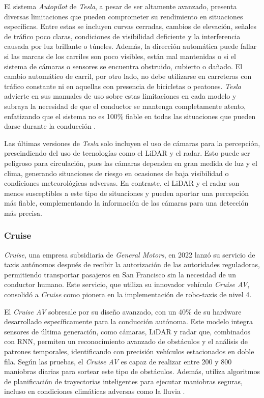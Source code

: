 El sistema \textit{Autopilot} de \textit{Tesla}, a pesar de ser altamente avanzado, presenta diversas limitaciones que pueden comprometer su rendimiento en situaciones específicas. Entre estas se incluyen curvas cerradas, cambios de elevación, señales de tráfico poco claras, condiciones de visibilidad deficiente y la interferencia causada por luz brillante o túneles. Además, la dirección automática puede fallar si las marcas de los carriles son poco visibles, están mal mantenidas o si el sistema de cámaras o sensores se encuentra obstruido, cubierto o dañado. El cambio automático de carril, por otro lado, no debe utilizarse en carreteras con tráfico constante ni en aquellas con presencia de bicicletas o peatones. \textit{Tesla} advierte en sus manuales de uso sobre estas limitaciones en cada modelo y subraya la necesidad de que el conductor se mantenga completamente atento, enfatizando que el sistema no es 100\% fiable en todas las situaciones que pueden darse durante la conducción \cite{tesla-limitations}.

Las últimas versiones de \textit{Tesla} solo incluyen el uso de cámaras para la percepción, prescindiendo del uso de tecnologías como el \ac{LiDAR} y el radar. Esto puede ser peligroso para circulación, pues las cámaras dependen en gran medida de luz y el clima, generando situaciones de riesgo en ocasiones de baja visibilidad o condiciones meteorológicas adversas. En contraste, el \ac{LiDAR} y el radar son menos susceptibles a este tipo de situaciones y pueden aportar una percepción más fiable, complementando la información de las cámaras para una detección más precisa.

\subsubsection{Cruise}

\textit{Cruise}, una empresa subsidiaria de \textit{General Motors}, en 2022 lanzó su servicio de taxis autónomos después de recibir la autorización de las autoridades reguladoras, permitiendo transportar pasajeros en San Francisco sin la necesidad de un conductor humano. Este servicio, que utiliza su innovador vehículo \textit{Cruise AV}, consolidó a \textit{Cruise} como pionera en la implementación de robo-taxis de nivel 4. 

El \textit{Cruise AV} sobresale por su diseño avanzado, con un 40\% de su hardware desarrollado específicamente para la conducción autónoma. Este modelo integra sensores de última generación, como cámaras, \ac{LiDAR} y radar que, combinados con \ac{RNN}, permiten un reconocimiento avanzado de obstáculos y el análisis de patrones temporales, identificando con precisión vehículos estacionados en doble fila. Según las pruebas, el \textit{Cruise AV} es capaz de realizar entre 200 y 800 maniobras diarias para sortear este tipo de obstáculos. Además, utiliza algoritmos de planificación de trayectorias inteligentes para ejecutar maniobras seguras, incluso en condiciones climáticas adversas como la lluvia \cite{cruise}.

